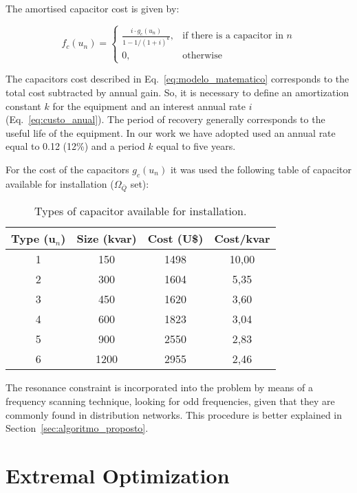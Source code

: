 \documentclass[11pt]{article}
\begin{document}
The amortised capacitor cost is given by:
 
\begin{equation}
f_c(u_n) = \begin{cases}
\frac{i\cdot g_c(u_n)}{1-1/(1+i)^k},&\text{if there is a capacitor in }n\\ 
 0, & \text{otherwise}
\label{eq:custo_anual}
\end{cases}
\end{equation}

The capacitors cost described in Eq.~\ref{eq:modelo_matematico} corresponds to the 
total cost subtracted by annual gain. So, it is necessary to define an amortization 
constant $k$ for the equipment and an interest annual rate $i$ (Eq.~\ref{eq:custo_anual}). The period of recovery
generally corresponds to the useful life of the equipment. In our work we have adopted used an annual rate 
equal to 0.12 (12\%) and a period $k$ equal to five years.

For the cost of the capacitors $g_c(u_n)$ it was used the following table
of capacitor available for installation ($\Omega_{\bar{Q}}$ set): 

\begin{table}[!htb]
\caption{Types of capacitor available for installation.}
\label{tab:capacitores}
\centering
\begin{tabular}{cccc}\toprule
   Type (u$_n$) & Size (kvar)     & Cost (U\$) & Cost/kvar\\ \toprule  
      1 	& 150             & 1498     & 10,00 \\
      2 	& 300             & 1604     & 5,35 \\
      3 	& 450             & 1620     & 3,60 \\
      4 	& 600             & 1823     & 3,04 \\
      5 	& 900             & 2550     & 2,83 \\
      6   & 1200            & 2955     & 2,46 \\            
  \bottomrule
\end{tabular}
\end{table}

The resonance constraint is incorporated into the problem by means of a
frequency scanning technique, looking for odd frequencies, given that they are commonly
found in distribution networks. This procedure is better explained 
in Section~\ref{sec:algoritmo_proposto}.

\section{Extremal Optimization}
\label{sec:oe}
\end{document}
